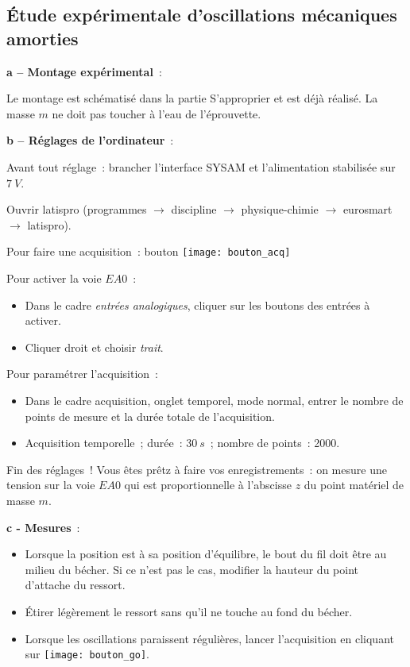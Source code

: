 \documentclass[a4paper, 11pt, final, garamond]{book}
\begin{document}
\subsection{Étude expérimentale d'oscillations mécaniques amorties}

\textbf{a -- Montage expérimental}~:

Le montage est schématisé dans la partie S'approprier et est déjà réalisé. La
masse $m$ ne doit pas toucher à l'eau de l'éprouvette.

\textbf{b -- Réglages de l'ordinateur}~:

Avant tout réglage~: brancher l'interface SYSAM et l'alimentation stabilisée sur
$\SI{7}{V}$.

Ouvrir latispro (programmes $\rightarrow$ discipline $\rightarrow$
physique-chimie $\rightarrow$ eurosmart $\rightarrow$ latispro).

\medskip

Pour faire une acquisition~: bouton
\texttt{[image: bouton\_acq]}

\medskip

Pour activer la voie $EA0$~:

\begin{itemize}
    \item Dans le cadre \textit{entrées analogiques}, cliquer sur  les boutons
        des entrées à activer.
    \item Cliquer droit et choisir \textit{trait}.
\end{itemize}

Pour paramétrer l'acquisition~:

\begin{itemize}
    \item Dans le cadre acquisition, onglet temporel, mode normal, entrer le
        nombre de points de mesure et la durée totale de l'acquisition.
    \item Acquisition temporelle~; durée~: $\SI{30}{s}$~; nombre de points~:
        2000.
\end{itemize}

Fin des réglages~! Vous êtes prêtz à faire vos enregistrements~: on mesure une
tension sur la voie $EA0$ qui est proportionnelle à l'abscisse $z$ du point
matériel de masse $m$.

\textbf{c - Mesures}~:

\begin{itemize}
    \item Lorsque la position est à sa position d'équilibre, le bout du fil doit
        être au milieu du bécher. Si ce n'est pas le cas, modifier la hauteur du
        point d'attache du ressort. 
    \item Étirer légèrement le ressort sans qu'il ne touche au fond du bécher. 
    \item Lorsque les oscillations paraissent régulières, lancer l'acquisition
        en cliquant sur \texttt{[image: bouton\_go]}.
\end{itemize}
\end{document}
